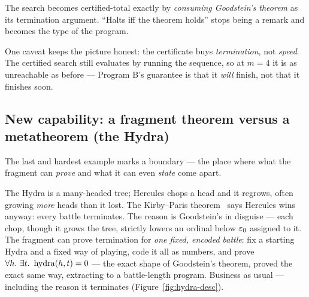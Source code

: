 \documentclass[11pt]{article}
\begin{document}
\begin{keystmt}
The search becomes certified-total exactly by \emph{consuming Goodstein's
theorem} as its termination argument. ``Halts iff the theorem holds'' stops
being a remark and becomes the type of the program.
\end{keystmt}

\noindent
One caveat keeps the picture honest: the certificate buys \emph{termination}, not
\emph{speed}. The certified search still evaluates by running the sequence, so at
$m=4$ it is as unreachable as before --- Program B's guarantee is that it
\emph{will} finish, not that it finishes soon.

\subsection*{New capability: a fragment theorem versus a metatheorem (the Hydra)}

The last and hardest example marks a boundary --- the place where what the
fragment can \emph{prove} and what it can even \emph{state} come apart.

The Hydra is a many-headed tree; Hercules chops a head and it regrows, often
growing \emph{more} heads than it lost. The Kirby--Paris
theorem~\citep{kirbyparis1982} says Hercules wins anyway: every battle
terminates. The reason is Goodstein's in disguise ---
each chop, though it grows the tree, strictly lowers an ordinal below $\varepsilon_0$
assigned to it. The fragment can prove termination for \emph{one fixed, encoded
battle}: fix a starting Hydra and a fixed way of playing, code it all as
numbers, and prove $\forall h.\ \exists t.\ \operatorname{hydra}(h,t)=0$ --- the exact shape of
Goodstein's theorem, proved the exact same way, extracting to a battle-length
program. Business as usual --- including the reason it terminates
(Figure~\ref{fig:hydra-desc}).
\end{document}
